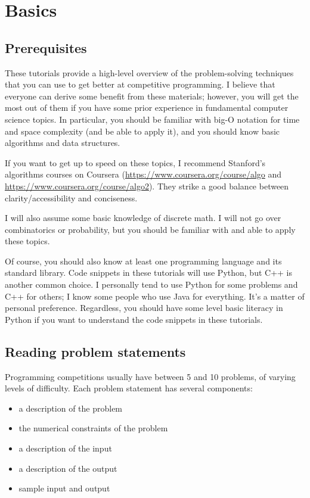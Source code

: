 \section{Basics}

\subsection*{Prerequisites}

These tutorials provide a high-level overview of the problem-solving techniques that you can use to get better at competitive programming. I believe that everyone can derive some benefit from these materials; however, you will get the most out of them if you have some prior experience in fundamental computer science topics. In particular, you should be familiar with big-O notation for time and space complexity (and be able to apply it), and you should know basic algorithms and data structures.

If you want to get up to speed on these topics, I recommend Stanford's algorithms courses on Coursera (\url{https://www.coursera.org/course/algo} and \url{https://www.coursera.org/course/algo2}). They strike a good balance between clarity/accessibility and conciseness.

I will also assume some basic knowledge of discrete math. I will not go over combinatorics or probability, but you should be familiar with and able to apply these topics.

Of course, you should also know at least one programming language and its standard library. Code snippets in these tutorials will use Python, but C++ is another common choice. I personally tend to use Python for some problems and C++ for others; I know some people who use Java for everything. It's a matter of personal preference. Regardless, you should have some level basic literacy in Python if you want to understand the code snippets in these tutorials.

\subsection*{Reading problem statements}

Programming competitions usually have between 5 and 10 problems, of varying levels of difficulty. Each problem statement has several components:

\begin{itemize}
\item a description of the problem
\item the numerical constraints of the problem
\item a description of the input
\item a description of the output
\item sample input and output
\end{itemize}

